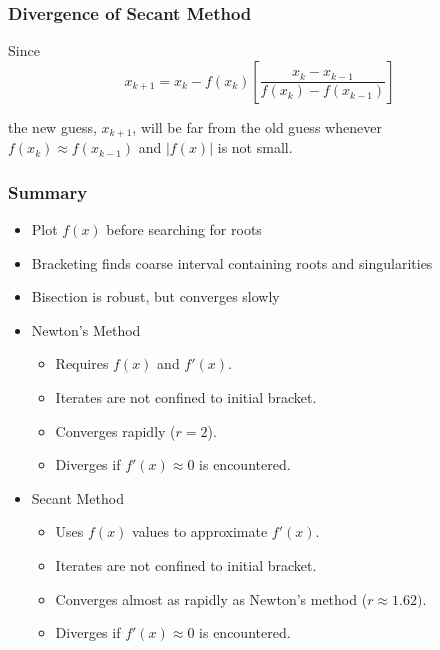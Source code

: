 \documentclass[10pt]{beamer}
\begin{document}
\begin{frame}
\frametitle{Divergence of Secant Method}

\vspace{4ex}
\begin{center}
\end{center}

\vspace{2ex}
Since
\begin{equation*}
    x_{k+1} = x_k - f(x_k) \left[ \frac{x_k - x_{k-1}}{f(x_k) - f(x_{k-1})} \right]
\end{equation*}

the new guess, $x_{k+1}$, will be far from the old guess
whenever $f(x_k)\approx f(x_{k-1})$ and $|f(x)|$ is not small.


\end{frame}
\begin{frame}
\frametitle{Summary}

\begin{itemize}
\item   Plot $f(x)$ before searching for roots
		\vspace{2ex}
\item   Bracketing finds coarse interval containing roots
		and singularities
		\vspace{2ex}
\item   Bisection is robust, but converges slowly
		\vspace{2ex}
\item   Newton's Method
	\begin{itemize}
		\item   Requires $f(x)$ and $f'(x)$.
		\item   Iterates are not confined to initial bracket.
		\item   Converges rapidly ($r=2$).
		\item   Diverges if $f'(x)\approx 0$ is encountered.
	\end{itemize}
		\vspace{2ex}
\item   Secant Method
	\begin{itemize}
		\item   Uses $f(x)$ values to approximate $f'(x)$.
		\item   Iterates are not confined to initial bracket.
		\item   Converges almost as rapidly as Newton's method ($r\approx
1.62)$.
		\item   Diverges if $f'(x)\approx 0$ is encountered.
	\end{itemize}
\end{itemize}




\end{frame}
\end{document}
